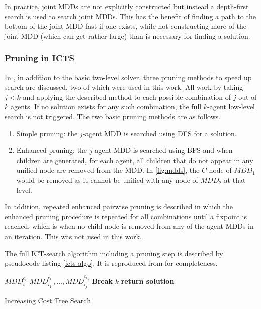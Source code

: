 \documentclass[english]{article}
\begin{document}
	In practice, joint MDDs are not explicitly constructed but instead a depth-first search is used to search joint MDDs. This has the benefit of finding a path to the bottom of the joint MDD fast if one exists, while not constructing more of the joint MDD (which can get rather large) than is necessary for finding a solution.
	\subsubsection{Pruning in ICTS}
	\label{pruning}
	In \cite{sharon2011}, in addition to the basic two-level solver, three pruning methods to speed up search are discussed, two of which were used in this work. All work by taking $j < k$ and applying the described method to each possible combination of $j$ out of $k$ agents. If no solution exists for any such combination, the full $k$-agent low-level search is not triggered. The two basic pruning methods are as follows.
	\begin{enumerate}
		\item Simple pruning: the $j$-agent MDD is searched using DFS for a solution.
		\item Enhanced pruning: the $j$-agent MDD is searched using BFS and when children are generated, for each agent, all children that do not appear in any unified node are removed from the MDD. In \ref{fig:mdds}, the $C$ node of $MDD_1$ would be removed as it cannot be unified with any node of $MDD_2$ at that level. 
	\end{enumerate}
	In addition, repeated enhanced pairwise pruning is described in which the enhanced pruning procedure is repeated for all combinations until a fixpoint is reached, which is when no child node is removed from any of the agent MDDs in an iteration. This was not used in this work. 
	
	The full ICT-search algorithm including a pruning step is described by pseudocode listing \ref{icts-algo}. It is reproduced from \cite{sharon2011} for completeness.
	\begin{algorithm}
		\begin{algorithmic}[1]
			\State {}
					 $MDD_i^{c_i}$
				\EndFor
				\State {}$MDD_{i_1}^{c_{i_1}},\ldots,MDD_{i_j}^{c_{i_j}}$
					\State \textbf{Break}
				\EndIf
				\EndFor
				\State {}$k$
				\State \textbf{return solution}
				\EndIf
			\EndFor

			\EndProcedure
		\end{algorithmic}
		\caption{Increasing Cost Tree Search}
		\label{icts-algo}
	\end{algorithm}
\end{document}
